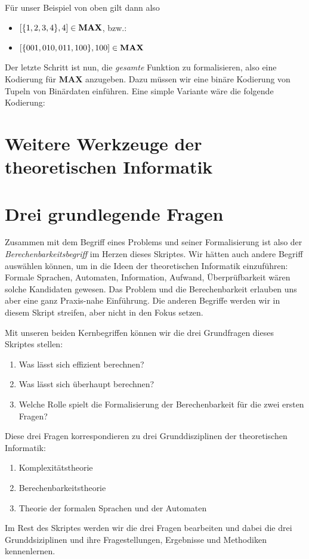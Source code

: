 \noindent
Für unser Beispiel von oben gilt dann also
\begin{itemize}
    \item $[\{1,2,3,4\},4] \in \bf{MAX}$, bzw.:
    \item $[\{001, 010, 011, 100\}, 100] \in \bf{MAX}$
\end{itemize}

Der letzte Schritt ist nun, die \emph{gesamte} Funktion zu formalisieren, also eine Kodierung
für \textbf{MAX} anzugeben.
Dazu müssen wir eine binäre Kodierung von Tupeln von Binärdaten einführen.
Eine simple Variante wäre die folgende Kodierung:

\section{Weitere Werkzeuge der theoretischen Informatik}

\section{Drei grundlegende Fragen}
Zusammen mit dem Begriff eines Problems und seiner Formalisierung ist also der
\emph{Berechenbarkeitsbegriff} im Herzen dieses Skriptes.
Wir hätten auch andere Begriff auswählen können, um in die Ideen der theoretischen Informatik einzuführen:
Formale Sprachen, Automaten, Information, Aufwand, Überprüfbarkeit wären solche Kandidaten gewesen.
Das Problem und die Berechenbarkeit erlauben uns aber eine ganz Praxis-nahe Einführung.
Die anderen Begriffe werden wir in diesem Skript streifen, aber nicht in den Fokus setzen.

Mit unseren beiden Kernbegriffen können wir die drei Grundfragen dieses Skriptes stellen:
\begin{enumerate}
    \item Was lässt sich effizient berechnen?
    \item Was lässt sich überhaupt berechnen?
    \item Welche Rolle spielt die Formalisierung der Berechenbarkeit für die zwei ersten Fragen?
\end{enumerate}

Diese drei Fragen korrespondieren zu drei Grunddisziplinen der theoretischen Informatik:
\begin{enumerate}
    \item Komplexitätstheorie
    \item Berechenbarkeitstheorie
    \item Theorie der formalen Sprachen und der Automaten
\end{enumerate}

Im Rest des Skriptes werden wir die drei Fragen bearbeiten und
dabei die drei Grunddsiziplinen und ihre Fragestellungen, Ergebnisse und Methodiken kennenlernen.
